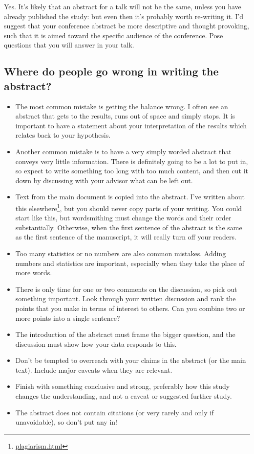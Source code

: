 \documentclass[
]{krantz}
\providecommand{\tightlist}{%
  \setlength{\itemsep}{0pt}\setlength{\parskip}{0pt}}
\renewcommand{\href}[2]{#2\footnote{\url{#1}}}
\begin{document}
Yes. It's likely that an abstract for a talk will not be the same, unless you have already published the study: but even then it's probably worth re-writing it. I'd suggest that your conference abstract be more descriptive and thought provoking, such that it is aimed toward the specific audience of the conference. Pose questions that you will answer in your talk.

\hypertarget{where-do-people-go-wrong-in-writing-the-abstract}{%
\subsection{Where do people go wrong in writing the abstract?}\label{where-do-people-go-wrong-in-writing-the-abstract}}

\begin{itemize}
\tightlist
\item
  The most common mistake is getting the balance wrong. I often see an abstract that gets to the results, runs out of space and simply stops. It is important to have a statement about your interpretation of the results which relates back to your hypothesis.
\item
  Another common mistake is to have a very simply worded abstract that conveys very little information. There is definitely going to be a lot to put in, so expect to write something too long with too much content, and then cut it down by discussing with your advisor what can be left out.
\item
  Text from the main document is copied into the abstract. I've written about this \href{plagiarism.html}{elsewhere}, but you should never copy parts of your writing. You could start like this, but wordsmithing must change the words and their order substantially. Otherwise, when the first sentence of the abstract is the same as the first sentence of the manuscript, it will really turn off your readers.
\item
  Too many statistics or no numbers are also common mistakes. Adding numbers and statistics are important, especially when they take the place of more words.
\item
  There is only time for one or two comments on the discussion, so pick out something important. Look through your written discussion and rank the points that you make in terms of interest to others. Can you combine two or more points into a single sentence?
\item
  The introduction of the abstract must frame the bigger question, and the discussion must show how your data responds to this.
\item
  Don't be tempted to overreach with your claims in the abstract (or the main text). Include major caveats when they are relevant.
\item
  Finish with something conclusive and strong, preferably how this study changes the understanding, and not a caveat or suggested further study.
\item
  The abstract does not contain citations (or very rarely and only if unavoidable), so don't put any in!


\end{itemize}
\end{document}
